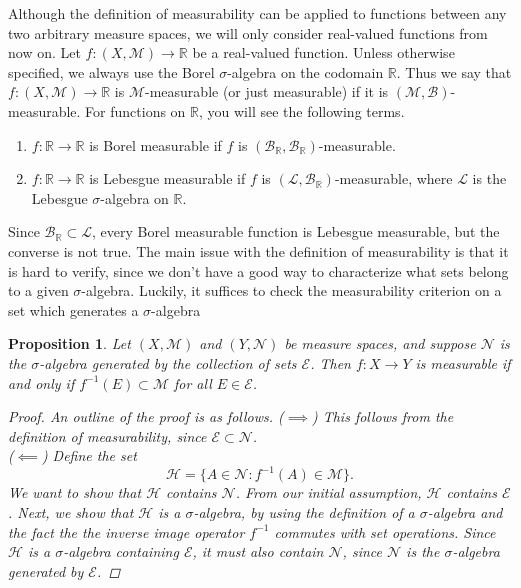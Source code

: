 \documentclass[12pt]{amsart}         %
\newtheorem{proposition}{Proposition}[section]
\theoremstyle{remark}
\newcommand{\R}{\mathbb{R}}
\begin{document}
Although the definition of measurability can be applied to functions between any two arbitrary measure spaces, we will only consider real-valued functions from now on. Let $f: (X,\mathcal{M}) \rightarrow \R$ be a real-valued function. Unless otherwise specified, we always use the Borel $\sigma$-algebra on the codomain $\R$. Thus we say that  $f: (X,\mathcal{M}) \rightarrow \R$ is $\mathcal{M}$-measurable (or just measurable) if it is $(\mathcal{M},\mathcal{B})$-measurable. For functions on $\R$, you will see the following terms.
\begin{enumerate}
    \item $f: \R \rightarrow \R$ is Borel measurable if $f$ is $(\mathcal{B}_\R,\mathcal{B}_\R)$-measurable.
    \item $f: \R \rightarrow \R$ is Lebesgue measurable if $f$ is $(\mathcal{L},\mathcal{B}_\R)$-measurable, where $\mathcal{L}$ is the Lebesgue $\sigma$-algebra on $\R$.
\end{enumerate}
Since $\mathcal{B}_\R \subset \mathcal{L}$, every Borel measurable function is Lebesgue measurable, but the converse is not true.
The main issue with the definition of measurability is that it is hard to verify, since we don't have a good way to characterize what sets belong to a given $\sigma$-algebra. Luckily, it suffices to check the measurability criterion on a set which generates a $\sigma$-algebra

\begin{proposition}
Let $(X,\mathcal{M})$ and $(Y,\mathcal{N})$ be measure spaces, and suppose $\mathcal{N}$ is the $\sigma$-algebra generated by the collection of sets $\mathcal{E}$. Then $f: X \to Y$ is measurable if and only if $f^{-1}(E) \subset \mathcal{M}$ for all $E \in \mathcal{E}$.

\begin{proof}An outline of the proof is as follows.
($\implies$) This follows from the definition of measurability, since $\mathcal{E} \subset \mathcal{N}$.\\
($\impliedby$) Define the set
\[
\mathcal{H}=\{A \in \mathcal{N}: f^{-1}(A) \in \mathcal{M}\}.
\]
We want to show that $\mathcal{H}$ contains $\mathcal{N}$. From our initial assumption, $\mathcal{H}$ contains $\mathcal{E}$. Next, we show that $\mathcal{H}$ is a $\sigma$-algebra, by using the definition of a $\sigma$-algebra and the fact the the inverse image operator $f^{-1}$ commutes with set operations. Since $\mathcal{H}$ is a $\sigma$-algebra containing $\mathcal{E}$, it must also contain $\mathcal{N}$, since $\mathcal{N}$ is the $\sigma$-algebra generated by $\mathcal{E}$.
\end{proof}
\end{proposition}
\end{document}
